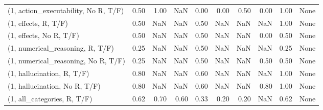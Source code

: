 \begin{table*}[h!]
\begin{adjustbox}{width=2\columnwidth,center}
\begin{tabular}{lrrr|rrr|rrr}
(1, action\_executability, No R, T/F) &                      0.50 &                  1.00 &                       NaN &                          0.00 &                      0.00 &                          0.50 &                                   0.00 &                               1.00 &                                  None \\
(1, effects, R, T/F)                 &                      0.50 &                   NaN &                       NaN &                          0.50 &                       NaN &                           NaN &                                    NaN &                               1.00 &                                  None \\
(1, effects, No R, T/F)              &                      0.50 &                   NaN &                       NaN &                          0.50 &                       NaN &                           NaN &                                   0.00 &                               0.50 &                                  None \\
(1, numerical\_reasoning, R, T/F)     &                      0.25 &                   NaN &                       NaN &                          0.50 &                       NaN &                           NaN &                                    NaN &                               0.25 &                                  None \\
(1, numerical\_reasoning, No R, T/F)  &                      0.25 &                   NaN &                       NaN &                          0.50 &                       NaN &                           NaN &                                   0.50 &                               0.50 &                                  None \\
(1, hallucination, R, T/F)           &                      0.80 &                   NaN &                       NaN &                          0.60 &                       NaN &                           NaN &                                    NaN &                               1.00 &                                  None \\
(1, hallucination, No R, T/F)        &                      0.80 &                   NaN &                       NaN &                          0.60 &                       NaN &                           NaN &                                   0.80 &                               1.00 &                                  None \\
(1, all\_categories, R, T/F)          &                      0.62 &                  0.70 &                      0.60 &                          0.33 &                      0.20 &                          0.20 &                                    NaN &                               0.62 &                                  None \\

\end{tabular}
\end{adjustbox}
\end{table*}
